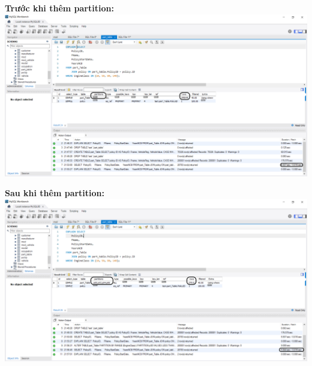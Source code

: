 \documentclass[12pt,a4paper]{report}
\begin{document}
	{\bf Trước khi thêm partition:}
	\\
	\includegraphics[width=\linewidth]{Before}
	
	{\bf Sau khi thêm partition:}
	\\
	\includegraphics[width=\linewidth]{After}
\end{document}
